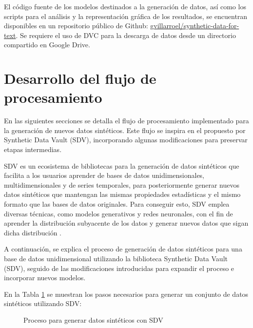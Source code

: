 

El código fuente de los modelos destinados a la generación de datos, así como los scripts para el análisis y la representación gráfica de los resultados, se encuentran disponibles en un repositorio público de Github:
\href{https://github.com/gvillarroel/synthetic-data-for-text}{gvillarroel/synthetic-data-for-text}. Se requiere el uso de DVC para la descarga de datos desde un directorio compartido en Google Drive.

\newpage

\section{Desarrollo del flujo de procesamiento}
\label{subsec:procesamiento}
En las siguientes secciones se detalla el flujo de procesamiento implementado para la generación de nuevos datos sintéticos. Este flujo se inspira en el propuesto por Synthetic Data Vault (SDV), incorporando algunas modificaciones para preservar etapas intermedias.

SDV es un ecosistema de bibliotecas para la generación de datos sintéticos que facilita a los usuarios aprender de bases de datos unidimensionales, multidimensionales y de series temporales, para posteriormente generar nuevos datos sintéticos que mantengan las mismas propiedades estadísticas y el mismo formato que las bases de datos originales. Para conseguir esto, SDV emplea diversas técnicas, como modelos generativos y redes neuronales, con el fin de aprender la distribución subyacente de los datos y generar nuevos datos que sigan dicha distribución \cite{kotelnikov_overview_nodate, patki_synthetic_2016}.

A continuación, se explica el proceso de generación de datos sintéticos para una base de datos unidimensional utilizando la biblioteca Synthetic Data Vault (SDV), seguido de las modificaciones introducidas para expandir el proceso e incorporar nuevos modelos.

En la Tabla \ref{process-sdv} se muestran los pasos necesarios para generar un conjunto de datos sintéticos utilizando SDV:

\begin{figure}[H]
	\centering
	
	\caption{Proceso para generar datos sintéticos con SDV}
	\label{process-sdv}
\end{figure}

